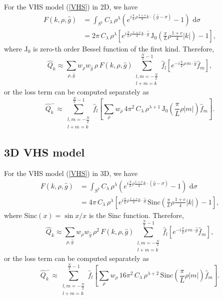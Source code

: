 \documentclass[review,times]{elsarticle}
\newcommand{\rd}{\,\mathrm{d}}
\begin{document}
For the VHS model (\ref{VHS}) in 2D, we have
\begin{align}
 F(k,\rho,\hat{g})&= \int_{S^1}C_{\lambda}\,\rho^{\lambda}\left(e^{i\frac{\pi}{L} \rho \frac{1+e}{4}k\cdot (\hat{g}-\sigma)}-1\right)\,\rd{\sigma}\nonumber\\
 &=2\pi \,C_{\lambda}\,\rho^{\lambda}\left[ e^{i\frac{\pi}{L}\rho \frac{1+e}{4}k\cdot \hat{g}}\,\text{J}_0\left(\frac{\pi}{L}\rho \frac{1+e}{4}|k|\right)-1\right],
\end{align}
where $\text{J}_0$ is zero-th order Bessel function of the first kind. Therefore,
\begin{equation} \label{full}
  \hat{Q}_k\approx\sum_{\rho,\hat{g}}w_{\rho}w_{\hat{g}}\,\rho \,F(k,\rho,\hat{g})\sum_{\substack{l,m=-\frac{N}{2}\\l+m=k}}^{\frac{N}{2}-1}\hat{f}_l \left[e^{-i\frac{\pi}{L}\rho\, m \cdot \hat{g}}\hat{f}_m\right],
\end{equation} 
or the loss term can be computed separately as
\begin{equation} \label{separate}
\hat{Q}_k^-\approx\sum_{\substack{l,m=-\frac{N}{2}\\l+m=k}}^{\frac{N}{2}-1}\hat{f}_l \left[\sum_{\rho}w_{\rho}\,4\pi^2\, C_{\lambda}\,\rho^{\lambda+1}\, \text{J}_0\left(\frac{\pi}{L}\rho |m|\right)\hat{f}_m\right].
\end{equation}

\subsection{3D VHS model}

For the VHS model (\ref{VHS}) in 3D, we have
\begin{align}
  F(k,\rho,\hat{g})&=\int_{S^2}C_{\lambda}\,\rho^{\lambda}\left(e^{i\frac{\pi}{L}\rho \frac{1+e}{4}k\cdot (\hat{g}-\sigma)}-1\right)\,\rd{\sigma}\nonumber\\
  &=4\pi \,C_{\lambda}\,\rho^{\lambda}\left[ e^{i\frac{\pi}{L}\rho \frac{1+e}{4}k\cdot \hat{g}}\,\text{Sinc}\left(\frac{\pi}{L}\rho\frac{1+e}{4}|k|\right)-1\right],
\end{align}
where $\text{Sinc}(x)=\sin x/x$ is the Sinc function. Therefore,
\begin{equation} 
\hat{Q}_k\approx\sum_{\rho,\hat{g}}w_{\rho}w_{\hat{g}}\, \rho^2\,F(k,\rho,\hat{g})\sum_{\substack{l,m=-\frac{N}{2}\\l+m=k}}^{\frac{N}{2}-1}\hat{f}_l \left[e^{-i\frac{\pi}{L}\rho \,m \cdot \hat{g}}\hat{f}_m\right],
\end{equation} 
or the loss term can be computed separately as
\begin{equation} \label{separate3}
\hat{Q}_k^-\approx\sum_{\substack{l,m=-\frac{N}{2}\\l+m=k}}^{\frac{N}{2}-1}\hat{f}_l \left[\sum_{\rho}w_{\rho}\,16\pi^2 \,C_{\lambda}\,\rho^{\lambda+2} \,\text{Sinc}\left(\frac{\pi}{L}\rho |m|\right)\hat{f}_m\right].
\end{equation}
\end{document}
